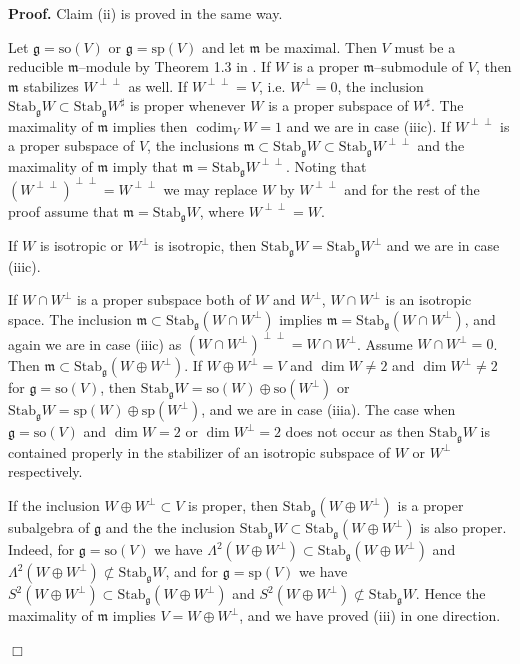 \documentclass[oneside,leqno,12pt]{article}
\newenvironment{proof}{ \noindent \textbf{Proof.}}{\hfill $\Box$}
\def\gg{\mathfrak{g}}
\def\gm{\mathfrak{m}}
\DeclareMathOperator{\codim}{codim}
\newcommand{\mm}{\mathfrak{m}}
\renewcommand{\gg}{\mathfrak{g}}
\newcommand{\Stab}{\mathrm{Stab}}
\renewcommand{\sp}{\mathrm{sp}}
\newcommand{\so}{\mathrm{so}}
\begin{document}
\begin{proof}
Claim (ii) is proved in the same way.

Let $\gg = \so(V)$ or $\gg  =\sp(V)$ and let $\gm$ be maximal.
Then $V$ must be a reducible $\gm$--module by Theorem 1.3 in \cite{BS}. If $W$ is a proper $\gm$--submodule of
$V$, then $\gm$ stabilizes $W^{\perp \perp}$ as well. If $W^{\perp \perp} = V$, i.e. $W^\perp = 0$, the inclusion
$\Stab_\gg W \subset \Stab_\gg W^\sharp$ is proper whenever $W$ is a proper subspace of $W^\sharp$.  
The
maximality of $\gm$ implies then $\codim_V W = 1$ and we are in case (iiic). If $W^{\perp \perp}$
is a proper subspace of $V$, the inclusions $\gm \subset \Stab_\gg W \subset \Stab_\gg W^{\perp \perp}$ and the maximality
of $\gm$ imply that $\gm = \Stab_\gg W^{\perp \perp}$. Noting that $(W^{\perp \perp})^{\perp \perp} = W^{\perp \perp}$ we may replace
$W$ by $W^{\perp \perp}$ and for the rest of the proof assume that $\gm = \Stab_\gg W$, where $W^{\perp \perp} = W$. 

If $W$ is isotropic or $W^\perp$ is isotropic, then $\Stab_\gg W=\Stab_\gg W^\perp$ and we are in case (iiic). 
 
If $W\cap W^\perp$ is a proper subspace both of $W$ and $W^\perp$, $W\cap W^\perp$ 
is an isotropic space. The inclusion $\mm\subset\Stab_\gg(W\cap W^\perp)$  implies 
$\mm=\Stab_\gg(W\cap W^\perp)$, and again we are in case (iiic) as $(W \cap W^\perp)^{\perp \perp} = W \cap W^\perp$.
Assume $W\cap W^\perp = 0$. 
Then $\gm \subset \Stab_\gg (W \oplus W^\perp)$. If $W \oplus W^\perp = V$ and $\dim W \neq 2$ and $\dim W^\perp \neq 2$ for $\gg = \so(V)$, 
then $\Stab_\gg W = \so(W) \oplus \so(W^\perp)$ or
 $\Stab_\gg W = \sp(W) \oplus \sp(W^\perp)$, and we 
are in case (iiia). The case when $\gg = \so(V)$ and $\dim W =2$ or $\dim W^\perp = 2$ does not occur as then $\Stab_\gg W$ is contained properly in
the stabilizer of an isotropic  subspace of $W$ or $W^\perp$ respectively. 

If the inclusion $W \oplus W^\perp \subset V$ is proper, 
 then $\Stab_\gg (W \oplus W^\perp)$ is a proper subalgebra of $\gg$ and the 
 the inclusion $\Stab_\gg W \subset
\Stab_\gg(W \oplus W^\perp)$ is also proper.  
Indeed, for $\gg = \so(V)$ we have $\Lambda^2(W \oplus W^\perp) \subset \Stab_\gg (W \oplus W^\perp)$ and 
$\Lambda^2(W \oplus W^\perp) \not \subset \Stab_\gg W$, and for 
$\gg = \sp(V)$ we have $S^2(W \oplus W^\perp) \subset \Stab_\gg (W \oplus W^\perp)$ and 
$S^2(W \oplus W^\perp) \not \subset \Stab_\gg W$.
Hence the maximality of $\gm$ implies $V = W \oplus W^\perp$, and we have proved (iii) in one direction.




\end{proof}
\end{document}
